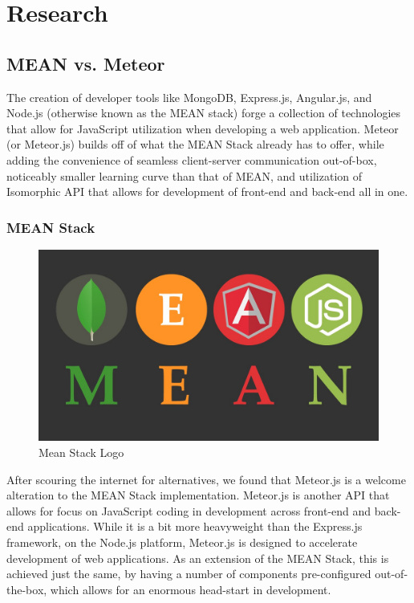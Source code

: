 \documentclass[12pt,a4paper]{report}
\begin{document}
\newpage
\chapter*{Research}
	\section{MEAN vs. Meteor}
	The creation of developer tools like MongoDB, Express.js, Angular.js, and Node.js (otherwise known as the MEAN stack) forge a collection of technologies that allow for JavaScript utilization when developing a web application. Meteor (or Meteor.js) builds off of what the MEAN Stack already has to offer, while adding the convenience of seamless client-server communication out-of-box, noticeably smaller learning curve than that of MEAN, and utilization of Isomorphic API that allows for development of front-end and back-end all in one.
	
		\subsection{MEAN Stack}
		\begin{figure}[H]
			\centering
			\includegraphics[scale=.2]{meanStack}
			\caption{Mean Stack Logo}
			\label{fig: Mean Stack Logo}
		\end{figure}
		After scouring the internet for alternatives, we found that Meteor.js is a welcome alteration to the MEAN Stack implementation. Meteor.js is another API that allows for focus on JavaScript coding in development across front-end and back-end applications. While it is a bit more heavyweight than the Express.js framework, on the Node.js platform, Meteor.js is designed to accelerate development of web applications. As an extension of the MEAN Stack, this is achieved just the same, by having a number of components pre-configured out-of-the-box, which allows for an enormous head-start in development.
			\newpage
\end{document}
